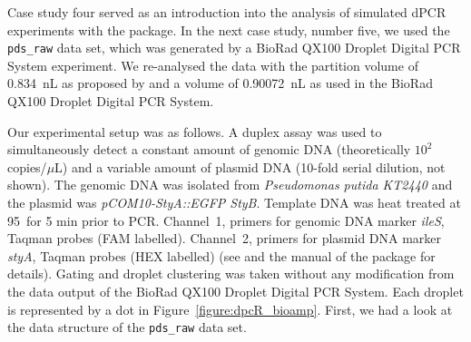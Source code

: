 Case study four served as an introduction into the analysis of simulated dPCR 
experiments with the  package. In the next case study, number 
five, we used the \texttt{pds\_raw} data set, which was generated by a BioRad 
QX100 Droplet Digital PCR System experiment. We re-analysed the data with the 
partition volume of 0.834~nL as proposed by \citet{corbisier_2015} and a volume 
of 0.90072~nL as used in the BioRad QX100 Droplet Digital PCR System.

Our experimental setup was as follows. A duplex assay was used to simultaneously 
detect a constant amount of genomic DNA (theoretically $10^{2}$ copies/$\mu$L) 
and a variable amount of plasmid DNA (10-fold serial dilution, not shown). The 
genomic DNA was isolated from \textit{Pseudomonas putida KT2440} and the plasmid 
was \textit{pCOM10-StyA::EGFP StyB}. Template DNA was heat treated at 
95\textcelsius~for 5 min prior to PCR. Channel~1, primers for genomic DNA marker 
\textit{ileS}, Taqman probes (FAM labelled). Channel~2, primers for plasmid DNA 
marker \textit{styA}, Taqman probes (HEX labelled) (see \citep{jahn_2013, 
jahn_2014} and the manual of the  package for details). Gating and 
droplet clustering was taken without any modification from the data output of 
the BioRad QX100 Droplet  Digital PCR System. Each droplet is represented by a 
dot in Figure~\ref{figure:dpcR_bioamp}. First, we had a look at the data 
structure of the \texttt{pds\_raw} data set.


